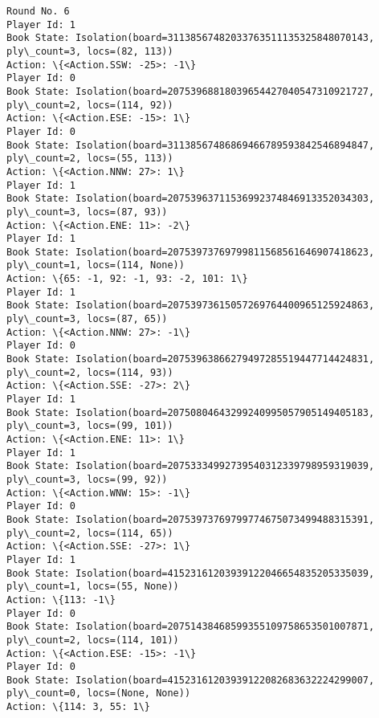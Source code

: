 \documentclass[11pt]{article}
\begin{document}
\begin{Verbatim}[commandchars=\\\{\}]
Round No. 6
Player Id: 1
Book State: Isolation(board=31138567482033763511135325848070143, ply\_count=3, locs=(82, 113))
Action: \{<Action.SSW: -25>: -1\}
Player Id: 0
Book State: Isolation(board=20753968818039654427040547310921727, ply\_count=2, locs=(114, 92))
Action: \{<Action.ESE: -15>: 1\}
Player Id: 0
Book State: Isolation(board=31138567486869466789593842546894847, ply\_count=2, locs=(55, 113))
Action: \{<Action.NNW: 27>: 1\}
Player Id: 1
Book State: Isolation(board=20753963711536992374846913352034303, ply\_count=3, locs=(87, 93))
Action: \{<Action.ENE: 11>: -2\}
Player Id: 1
Book State: Isolation(board=20753973769799811568561646907418623, ply\_count=1, locs=(114, None))
Action: \{65: -1, 92: -1, 93: -2, 101: 1\}
Player Id: 1
Book State: Isolation(board=20753973615057269764400965125924863, ply\_count=3, locs=(87, 65))
Action: \{<Action.NNW: 27>: -1\}
Player Id: 0
Book State: Isolation(board=20753963866279497285519447714424831, ply\_count=2, locs=(114, 93))
Action: \{<Action.SSE: -27>: 2\}
Player Id: 1
Book State: Isolation(board=20750804643299240995057905149405183, ply\_count=3, locs=(99, 101))
Action: \{<Action.ENE: 11>: 1\}
Player Id: 1
Book State: Isolation(board=20753334992739540312339798959319039, ply\_count=3, locs=(99, 92))
Action: \{<Action.WNW: 15>: -1\}
Player Id: 0
Book State: Isolation(board=20753973769799774675073499488315391, ply\_count=2, locs=(114, 65))
Action: \{<Action.SSE: -27>: 1\}
Player Id: 1
Book State: Isolation(board=41523161203939122046654835205335039, ply\_count=1, locs=(55, None))
Action: \{113: -1\}
Player Id: 0
Book State: Isolation(board=20751438468599355109758653501007871, ply\_count=2, locs=(114, 101))
Action: \{<Action.ESE: -15>: -1\}
Player Id: 0
Book State: Isolation(board=41523161203939122082683632224299007, ply\_count=0, locs=(None, None))
Action: \{114: 3, 55: 1\}


\end{Verbatim}
\end{document}
